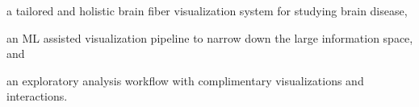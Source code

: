 \begin{compactitem}
	\item a tailored and holistic brain fiber visualization system for studying brain disease,
	\item an ML assisted visualization pipeline to narrow down the large information space, and
	\item an exploratory analysis workflow with complimentary visualizations and interactions.
\end{compactitem}

\color{black}

